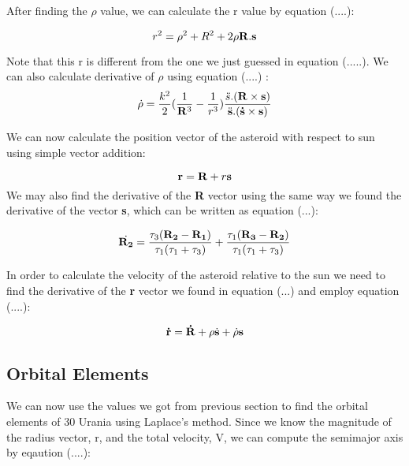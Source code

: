 \documentclass[letterpaper,12pt]{article}
\begin{document}
After finding the \begin{math} \rho \end{math} value, we can calculate the r value by equation (....):

\begin{equation}
r^2=\rho ^2 + R^2 + 2\rho {\bf R}. {\bf s}
\end{equation}

Note that this r is different from the one we just guessed in equation (.....). 
We can also calculate derivative of \begin{math} \rho \end{math} using equation (....) :
\begin{equation}
\dot{\rho}=\frac{k^2}{2}(\frac{1}{{\bf R}^3}-\frac{1}{r^3})\frac{\ddot{s}.({\bf R}\times {\bf s})}{\ddot{{\bf s}}.({\bf \dot{s}}\times {\bf s})}
\end{equation}

We can now calculate the position vector of the asteroid with respect to sun using simple vector addition:

\begin{equation}
{\bf r}= {\bf R}+r{\bf s}
\end{equation}
We may also find the derivative of the {\bf R} vector using the same way we found the derivative of the vector {\bf s}, which can be written as equation (...):

\begin{equation}
\dot{{\bf R_{2}}}=\frac{\tau_{3}({\bf R_{2}}-{\bf R_{1}})}{\tau_{1}(\tau_{1}+\tau_{3})}+\frac{\tau_{1}({\bf R_{3}}-{\bf R_{2}})}{\tau_{1}(\tau_{1}+\tau_{3})}
\end{equation}

In order to calculate the velocity of the asteroid relative to the sun we need to find the derivative of the {\bf r} vector we found in equation (...) and employ equation (....):

\begin{equation}
{\bf \dot{r}}={\bf \dot{R}} +\rho{\dot{\bf s}} + \dot{\rho} {\bf s}
\end{equation}


\subsection{Orbital Elements}
We can now use the values we got from previous section to find the orbital elements of 30 Urania using Laplace's method. Since we know the magnitude of the radius vector, r, and the total velocity, V, we can compute the semimajor axis by eqaution (....):
\end{document}
